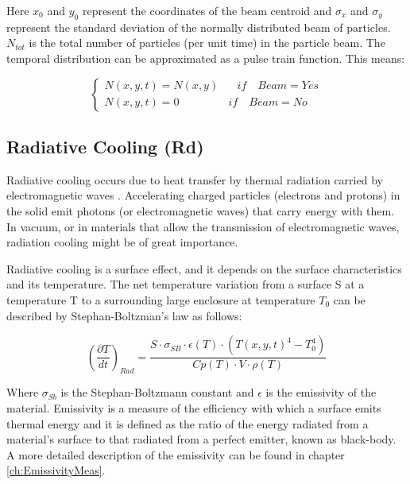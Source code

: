 Here $x_0$ and $y_0$ represent the coordinates of the beam centroid and $\sigma_x$ and $\sigma_y$ represent the standard deviation of the normally distributed beam of particles. $N_{tot}$ is the total number of particles (per unit time) in the particle beam. The temporal distribution can be approximated as a pulse train function. This means: 

\begin{equation}
    \begin{cases}
      N(x,y,t) = N(x,y) \mspace{30mu} if\mspace{18mu}Beam = Yes \\
      N(x,y,t) = 0 \mspace{80mu} if \mspace{18mu}Beam = No 
    \end{cases}
\end{equation}

\subsection{Radiative Cooling (Rd)}

Radiative cooling occurs due to heat transfer by thermal radiation carried by electromagnetic waves \parencite[][]{ref:RadiativeCooling}. Accelerating charged particles (electrons and protons) in the solid emit photons (or electromagnetic waves) that carry energy with them. In vacuum,  or in materials that allow the transmission of electromagnetic waves, radiation cooling might be of great importance. 

Radiative cooling is a surface effect, and it depends on the surface characteristics and its temperature.  The net temperature variation from a surface S at a temperature T to a surrounding large enclosure at temperature $T_0$ can be described by Stephan-Boltzman's law as follows: 

\begin{equation}
    \left( \frac{\partial T}{dt} \right)_{Rad} = \frac{S\cdot \sigma_{SB}\cdot \epsilon(T)\cdot \left(T(x,y,t)^4 - T_0^4\right)}{Cp(T)\cdot V \cdot \rho(T)}
\end{equation}

Where $\sigma_{Sb}$ is the Stephan-Boltzmann constant and $\epsilon$ is the emissivity of the material. Emissivity is a measure of the efficiency with which a surface emits thermal energy and it is defined as the ratio of the energy radiated from a material's surface to that radiated from a perfect emitter, known as black-body. A more detailed description of the emissivity can be found in chapter \ref{ch:EmissivityMeas}. 

